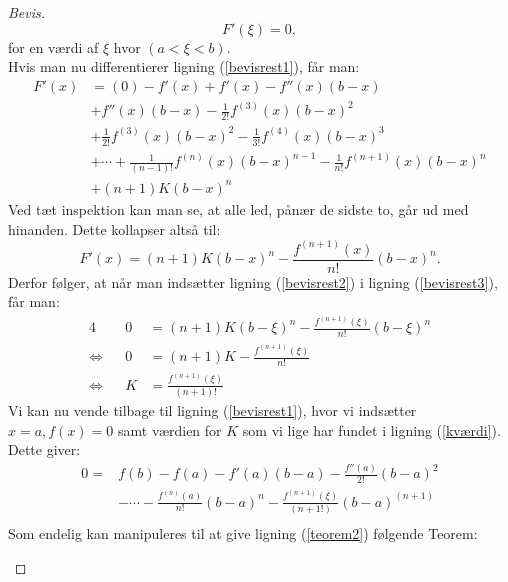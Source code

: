 \documentclass[12pt, a4paper]{article}
\begin{document}
\begin{refsection}
\begin{proof}[Bevis]
\begin{equation}\label{bevisrest2}
    F'(\xi)=0,
\end{equation}
for en værdi af $\xi$ hvor $(a<\xi<b)$.\\
Hvis man nu differentierer ligning (\ref{bevisrest1}), får man:
\begin{equation*}
    \begin{aligned}
        F'(x) &=(0) -f'(x)+f'(x)-f''(x)(b-x)\\
              &+f''(x)(b-x)-\frac{1}{2!}f^{(3)}(x)(b-x)^2\\
              &+\frac{1}{2!}f^{(3)}(x)(b-x)^2-\frac{1}{3!}f^{(4)}(x)(b-x)^3\\
              &+\cdots + \frac{1}{(n-1)!}f^{(n)}(x)(b-x)^{n-1}-\frac{1}{n!}f^{(n+1)}(x)(b-x)^n\\
              &+(n+1)K(b-x)^n
    \end{aligned}
\end{equation*}
Ved tæt inspektion kan man se, at alle led, pånær de sidste to, går ud med hinanden. Dette kollapser altså til:
\begin{equation}\label{bevisrest3}
    F'(x)=(n+1)K(b-x)^n-\frac{f^{(n+1)}(x)}{n!}(b-x)^n.
\end{equation}
Derfor følger, at når man indsætter ligning (\ref{bevisrest2}) i ligning (\ref{bevisrest3}), får man:
    \begin{alignat}{4}
       && 0&=(n+1)K(b-\xi)^n-\frac{f^{(n+1)}(\xi)}{n!}(b-\xi)^n\nonumber\\
        \Leftrightarrow&&  0&=(n+1)K-\frac{f^{(n+1)}(\xi)}{n!}\nonumber\\
        \Leftrightarrow&&  K&=\frac{f^{(n+1)}(\xi)}{(n+1)!}\label{kværdi}
    \end{alignat}
    Vi kan nu vende tilbage til ligning (\ref{bevisrest1}), hvor vi indsætter $x=a,f(x)=0$ samt værdien for  $K$ som vi lige har fundet i ligning (\ref{kværdi}). Dette giver:
    \begin{equation*}
        \begin{aligned}
         0=&f(b)-f(a)-f'(a)(b-a)-\frac{f''(a)}{2!}(b-a)^2\\
         &-\cdots-\frac{f^{(n)}(a)}{n!}(b-a)^n-\frac{f^{(n+1)}(\xi)}{(n+1!)}(b-a)^{(n+1)}\\
         \end{aligned}
     \end{equation*}
     Som endelig kan manipuleres til at give ligning (\ref{teorem2}) følgende Teorem:
     \begin{mdframed}

\end{mdframed}
\end{proof}
\end{refsection}
\end{document}
